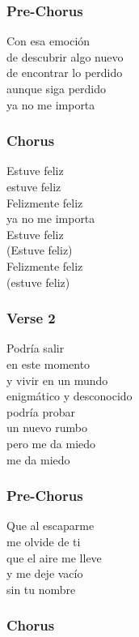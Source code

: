 \subsubsection{Pre-Chorus}\label{pre-chorus-18}

Con esa emoción\\
de descubrir algo nuevo\\
de encontrar lo perdido\\
aunque siga perdido\\
ya no me importa

\subsubsection{Chorus}\label{chorus-40}

Estuve feliz\\
estuve feliz\\
Felizmente feliz\\
ya no me importa\\
Estuve feliz\\
(Estuve feliz)\\
Felizmente feliz\\
(estuve feliz)

\subsubsection{Verse 2}\label{verse-2-18}

Podría salir\\
en este momento\\
y vivir en un mundo\\
enigmático y desconocido\\
podría probar\\
un nuevo rumbo\\
pero me da miedo\\
me da miedo

\subsubsection{Pre-Chorus}\label{pre-chorus-19}

Que al escaparme\\
me olvide de ti\\
que el aire me lleve\\
y me deje vacío\\
sin tu nombre

\subsubsection{Chorus}\label{chorus-41}

